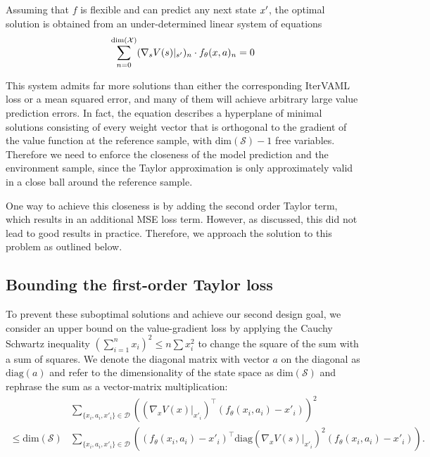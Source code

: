 Assuming that $f$ is flexible and can predict any next state $x'$, the optimal solution is obtained from an under-determined linear system of equations
\begin{align}
    \sum_{n=0}^{\text{dim}(\mathcal{X})} (\nabla_s V(s)|_{s'})_n \cdot f_\theta(x,a)_n = 0
\end{align}

This system admits far more solutions than either the corresponding IterVAML loss or a mean squared error, and many of them will achieve arbitrary large value prediction errors.
In fact, the equation describes a hyperplane of minimal solutions consisting of every weight vector that is orthogonal to the gradient of the value function at the reference sample, with $\text{dim}(\mathcal{S}) - 1$ free variables.
Therefore we need to enforce the closeness of the model prediction and the environment sample, since the Taylor approximation is only approximately valid in a close ball around the reference sample.

One way to achieve this closeness is by adding the second order Taylor term, which results in an additional MSE loss term.
However, as discussed, this did not lead to good results in practice. 
Therefore, we approach the solution to this problem as outlined below.

\subsection{Bounding the first-order Taylor loss}

To prevent these suboptimal solutions and achieve our second design goal, we consider an upper bound on the value-gradient loss by applying the Cauchy Schwartz inequality $\left(\sum_{i=1}^n x_i \right) ^2 \leq n \sum x_i^2$ to change the square of the sum with a sum of squares.
We denote the diagonal matrix with vector $a$ on the diagonal as $\text{diag}(a)$ and refer to the dimensionality of the state space as $\text{dim}(\mathcal{S})$ and rephrase the sum as a vector-matrix multiplication:
\begin{align}
    &\sum_{\{x_i,a_i,x'_i\}\in\mathcal{D}} {\left((\nabla_x V(x)|_{x'_i})^\intercal(f_\theta(x_i,a_i) - x'_i) \right)^2}\\
    \leq {\text{dim}(\mathcal{S})} &\sum_{\{x_i,a_i,x'_i\}\in\mathcal{D}}\left((f_\theta(x_i,a_i) - x'_i)^\intercal\text{diag}(\nabla_x V(s)|_{x'_i})^2(f_\theta(x_i,a_i) - x'_i) \right) \label{eq:vagram:upper_bound}.
\end{align}

